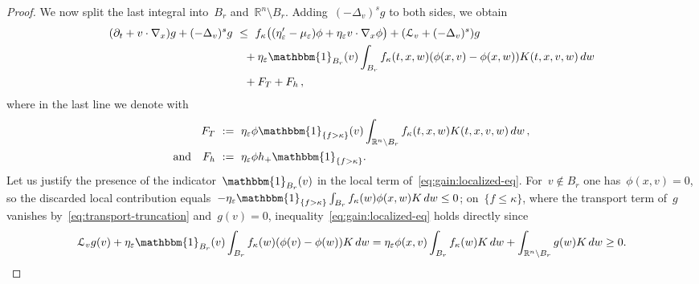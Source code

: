 \documentclass[leqno,10pt]{amsart}
\theoremstyle{plain}
\theoremstyle{remark}
\numberwithin{equation}{section}
\def\dw{\,{\rm d}w}
\def\er{\mathbb{R}}
\def\ern{\mathbb{R}^n}
\newcommand{\Lc}{\mathcal{L}_v}
\newcommand{\kk}{\kappa}
\newcommand{\eps}{\varepsilon}
\begin{document}
{\begin{proof}
  We now split the last integral into~$B_r$ and~$\er^n\setminus B_r$.  Adding~$(-\Delta_v)^sg$ to both sides, we obtain
  \begin{equation}\label{eq:gain:localized-eq}
  \begin{aligned}
   (\partial_t+v\cdot\nabla_x)g+(-\Delta_v)^sg
   &  \ \leq \ f_\kk\bigl((\eta_\eps'-\mu_\eps)\phi+\eta_\eps v\cdot\nabla_x\phi\bigr)+(\Lc+(-\Delta_v)^s)g\\
   & \quad + \eta_\eps\mathbbm{1}_{B_r}(v)\int_{B_r}f_\kk(t,x,w)(\phi(x,v)-\phi(x,w))K(t,x,v,w)\dw\\
   &\quad + F_T + F_h\,,
  \end{aligned}
  \end{equation}
  where in the last line we denote with
  \[
  \begin{aligned}
  F_T & \ := \ \eta_\eps\phi\mathbbm{1}_{\{f>\kk\}}(v)\int_{\er^n\setminus B_r}f_\kk(t,x,w)K(t,x,v,w)\dw\,,\\
  \text{and} \quad F_h & \ := \ \eta_\eps\phi h_+\mathbbm{1}_{\{f>\kk\}}.
  \end{aligned}
  \]
  Let us justify the presence of the indicator~$\mathbbm{1}_{B_r}(v)$ in the local term of~\eqref{eq:gain:localized-eq}.
  For~$v\notin B_r$ one has~$\phi(x,v)=0$, so the discarded local contribution equals~$-\eta_\eps\mathbbm{1}_{\{f>\kk\}}\int_{B_r}f_\kk(w)\phi(x,w)K\dw\leq0$; on~$\{f\leq\kk\}$, where the transport term of~$g$ vanishes by~\eqref{eq:transport-truncation} and~$g(v)=0$, inequality~\eqref{eq:gain:localized-eq} holds directly since 
  $$\Lc g(v)+\eta_\eps\mathbbm{1}_{B_r}(v)\int_{B_r}f_\kk(w)(\phi(v)-\phi(w))K\dw = \eta_\eps\phi(x,v)\int_{B_r}f_\kk(w)K\dw+\int_{\ern\setminus B_r}g(w)K\dw\geq0.$$
  
  \smallskip


\end{proof}}
\end{document}
